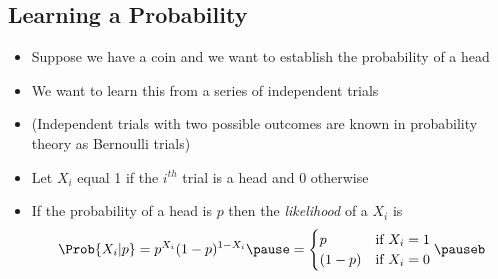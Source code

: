 \begin{slide}
\section[-1]{Learning a Probability}

\begin{PauseHighLight}
  \begin{itemize}
  \item Suppose we have a coin and we want to establish the probability
    of a head\pause
  \item We want to learn this from a series of independent trials\pause
  \item (Independent trials with two possible outcomes are known in
    probability theory as Bernoulli trials)\pause
  \item Let $X_i$ equal 1 if the $i^{th}$ trial is a head and 0
    otherwise\pause 
  \item If the probability of a head is $p$ then the \emph{likelihood}
    of a $X_i$ is
    \begin{align*}
      \Prob{X_i|p} = p^{X_i} (1-p)^{1-X_i}\pause =
      \begin{cases}
        p & \text{if $X_i=1$}\\
        (1-p) & \text{if $X_i=0$}
      \end{cases}\pauseb
    \end{align*}
  \end{itemize}
\end{PauseHighLight}

\end{slide}



